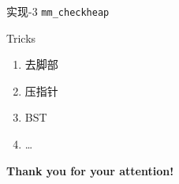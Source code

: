 \documentclass{beamer}
\begin{document}
\begin{frame}{实现-3}
	\texttt{mm\_checkheap}
\end{frame}

\begin{frame}{Tricks}
	\begin{enumerate}
		\item 去脚部
		\item 压指针
		\item BST
		\item \dots
	\end{enumerate}
\end{frame}
  
\begin{frame}{}
\begin{center}
	\textbf{Thank you for your attention!}
\end{center}
\end{frame}
\end{document}
